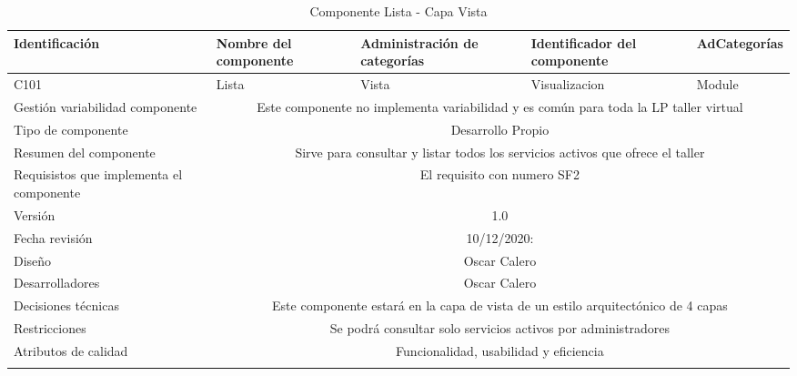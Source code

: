 \documentclass[10pt,a4paper,openany]{book}
\begin{document}
\begin{longtable}{|p{3cm}|p{3cm}|p{3cm}|p{3cm}|p{3cm}|} \hline
Identificación & Nombre del componente & Administración de categorías & Identificador del componente & AdCategorías \\[0.5ex] \hline
C101& Lista& Vista& Visualizacion& Module\\[0.5ex] \hline
Gestión variabilidad componente & \multicolumn{4}{|c|}{Este componente no implementa variabilidad y es común para toda la LP taller virtual} \\ \hline
Tipo de componente & \multicolumn{4}{|c|}{Desarrollo Propio} \\ \hline
Resumen del componente & \multicolumn{4}{|c|}{Sirve para consultar y listar todos los servicios activos que ofrece el taller} \\ \hline
Requisistos que implementa el componente & \multicolumn{4}{|c|}{El requisito con numero SF2 } \\ \hline
Versión & \multicolumn{4}{|c|}{1.0 } \\ \hline
Fecha revisión & \multicolumn{4}{|c|}{ 10/12/2020:} \\ \hline
Diseño & \multicolumn{4}{|c|}{Oscar Calero} \\ \hline
Desarrolladores & \multicolumn{4}{|c|}{Oscar Calero} \\ \hline
Decisiones técnicas & \multicolumn{4}{|c|}{Este componente estará en la capa de vista de un estilo arquitectónico de 4 capas  } \\ \hline
Restricciones & \multicolumn{4}{|c|}{Se podrá consultar solo servicios activos por administradores} \\ \hline
Atributos de calidad & \multicolumn{4}{|c|}{Funcionalidad, usabilidad y eficiencia} \\ \hline
\caption{Componente Lista - Capa Vista}
\label{table:t6}
\end{longtable}
\end{document}
